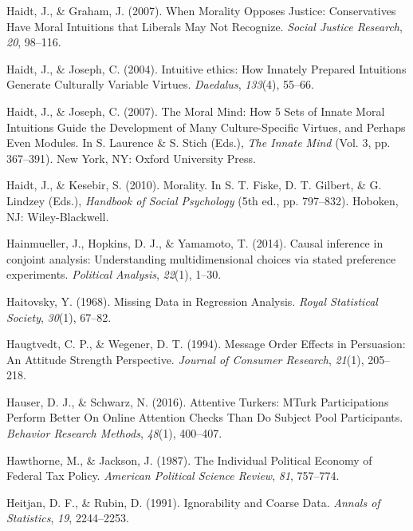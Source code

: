 \documentclass[12pt,econ]{sources/authesis}
\begin{document}
\leavevmode\hypertarget{ref-haidt_2007_when}{}%
Haidt, J., \& Graham, J. (2007). When Morality Opposes Justice: Conservatives Have Moral Intuitions that Liberals May Not Recognize. \emph{Social Justice Research}, \emph{20}, 98--116.

\leavevmode\hypertarget{ref-haidt_2004_intuitive}{}%
Haidt, J., \& Joseph, C. (2004). Intuitive ethics: How Innately Prepared Intuitions Generate Culturally Variable Virtues. \emph{Daedalus}, \emph{133}(4), 55--66.

\leavevmode\hypertarget{ref-haidt_2007_moral}{}%
Haidt, J., \& Joseph, C. (2007). The Moral Mind: How 5 Sets of Innate Moral Intuitions Guide the Development of Many Culture-Specific Virtues, and Perhaps Even Modules. In S. Laurence \& S. Stich (Eds.), \emph{The Innate Mind} (Vol. 3, pp. 367--391). New York, NY: Oxford University Press.

\leavevmode\hypertarget{ref-haidt_2010_morality}{}%
Haidt, J., \& Kesebir, S. (2010). Morality. In S. T. Fiske, D. T. Gilbert, \& G. Lindzey (Eds.), \emph{Handbook of Social Psychology} (5th ed., pp. 797--832). Hoboken, NJ: Wiley-Blackwell.

\leavevmode\hypertarget{ref-hainmueller_2014_causal}{}%
Hainmueller, J., Hopkins, D. J., \& Yamamoto, T. (2014). Causal inference in conjoint analysis: Understanding multidimensional choices via stated preference experiments. \emph{Political Analysis}, \emph{22}(1), 1--30.

\leavevmode\hypertarget{ref-haitovsky_1968_missing}{}%
Haitovsky, Y. (1968). Missing Data in Regression Analysis. \emph{Royal Statistical Society}, \emph{30}(1), 67--82.

\leavevmode\hypertarget{ref-haugtvedt_1994_message}{}%
Haugtvedt, C. P., \& Wegener, D. T. (1994). Message Order Effects in Persuasion: An Attitude Strength Perspective. \emph{Journal of Consumer Research}, \emph{21}(1), 205--218.

\leavevmode\hypertarget{ref-hauser_attentive_2016}{}%
Hauser, D. J., \& Schwarz, N. (2016). Attentive Turkers: MTurk Participations Perform Better On Online Attention Checks Than Do Subject Pool Participants. \emph{Behavior Research Methods}, \emph{48}(1), 400--407.

\leavevmode\hypertarget{ref-hawthorne_individual_1987}{}%
Hawthorne, M., \& Jackson, J. (1987). The Individual Political Economy of Federal Tax Policy. \emph{American Political Science Review}, \emph{81}, 757--774.

\leavevmode\hypertarget{ref-heitjan_1991_ignorability}{}%
Heitjan, D. F., \& Rubin, D. (1991). Ignorability and Coarse Data. \emph{Annals of Statistics}, \emph{19}, 2244--2253.
\end{document}
